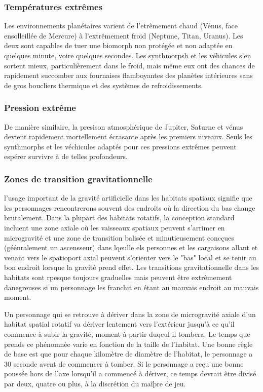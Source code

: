 \subsubsection{Températures extrêmes} 

Les environnements planétaires varient de l'etrêmement chaud (Vénus, face ensolleillée de Mercure) à l'extrêmement froid (Neptune, Titan, Uranus). Les deux sont capables de tuer une biomorph non protégée et non adaptée en quelques minute, voire quelques secondes. Les synthmorpsh et les véhicules s'en sortent mieux, particulièrement dans le froid, mais même eux ont des chances de rapidement succomber aux fournaises flamboyantes des planètes intérieures sans de gros boucliers thermique et des systèmes de refroidissements. 

\subsubsection{Pression extrême} 

De manière similaire, la presison atmosphérique de Jupiter, Saturne et vénus devient rapidement mortellement écrasante après les premiers niveaux. Seuls les synthmorphs et les véchicules adaptés pour ces pressions extrêmes peuvent espérer survivre à de telles profondeurs. 

\subsubsection{Zones de transition gravitationnelle} 

l'usage important de la gravité artificielle dans les habitats spatiaux signifie que les personnages rencontrerons souvent des endroits où la direction du bas change brutalement. Dans la plupart des habitats rotatifs, la conception standard incluent une zone axiale où les vaisseaux spatiaux peuvent s'arrimer en microgravité et une zone de transition balisée et minutieusement concçues (géénralement un ascensseur) dans lqeulle els personnes et les cargaisons allant et venant vers le spatioport axial peuvent s'orienter vers le "bas" local et se tenir au bon endroit lorsque la gravité prend effet. Les transitions gravitationnelle dans les habitats sont rpesque toujours graduelles mais peuvent être extrêmement danegreuses si un personnage les franchit en étant au mauvais endroit au mauvais moment. 

Un personnage qui se retrouve à dériver dans la zone de microgravité axiale d'un habitat spatial rotatif va dériver lentement vers l'extérieur jusqu'à ce qu'il commence à subir la gravité, moment à partir duqeul il tombera. Le temps que prends ce phénomnèe varie en fonction de la taille de l'habitat. Une bonne règle de base est que pour chaque kilomètre de diamètre de l'habitat, le personnage a 30 seconde avent de commencer à tomber. Si le personnage a reçu une bonne poussée hors de l'axe lorsqu'il a commencé à dériver, ce temps devrait être divisé par deux, quatre ou plus, à la discrétion du maîþre de jeu. 

